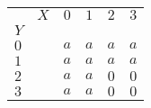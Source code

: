 
		\begin{center}
		\begin{tabular}{|l r||c|c|c|c|}
		    \hline 
		    		 &	$X$ & $0$ & $1$ & $2$ & $3$ \\ 
		    $Y$ &		  &		&			&			&		\\
		    \hline 
		    \hline
		    $0$ &		   & $a$ & $a$ & $a$ & $a$ \\ 
		    \hline 
		    $1$ &		   & $a$ & $a$ & $a$ & $a$ \\ 
		    \hline 
		    $2$ &		   & $a$ & $a$ & $0$ & $0$ \\ 
		    \hline 
		    $3$ &		   & $a$ & $a$ & $0$ & $0$ \\ 
		    \hline 
		  \end{tabular} 
	\end{center}